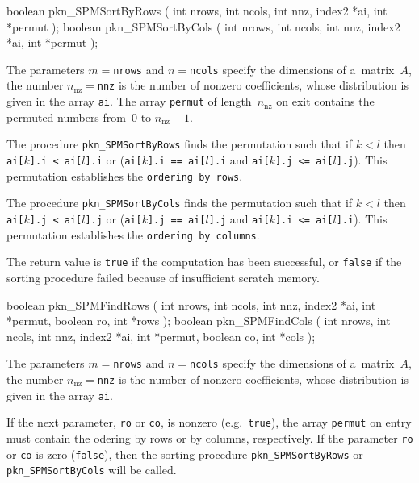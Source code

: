\begin{listingC}
boolean pkn_SPMSortByRows ( int nrows, int ncols, int nnz,
                            index2 *ai, int *permut );
boolean pkn_SPMSortByCols ( int nrows, int ncols, int nnz,
                            index2 *ai, int *permut );
\end{listingC}
The parameters $m=$\texttt{nrows} and $n=$\texttt{ncols} specify the
dimensions of a~matrix~$A$, the number $n_{\mathrm{nz}}=$\texttt{nnz} is
the number of nonzero coefficients, whose distribution is given in the array
\texttt{ai}. The array \texttt{permut} of length~$n_{\mathrm{nz}}$ on exit
contains the permuted numbers from~$0$ to $n_{\mathrm{nz}}-1$.

The procedure \texttt{pkn\_SPMSortByRows} finds the permutation such that
if $k<l$ then \texttt{ai[$k$].i < ai[$l$].i} or (\texttt{ai[$k$].i == ai[$l$].i}
and \texttt{ai[$k$].j <= ai[$l$].j}). This permutation establishes the
\texttt{ordering by rows}.

The procedure \texttt{pkn\_SPMSortByCols} finds the permutation such that
if $k<l$ then \texttt{ai[$k$].j < ai[$l$].j} or (\texttt{ai[$k$].j == ai[$l$].j}
and \texttt{ai[$k$].i <= ai[$l$].i}). This permutation establishes the
\texttt{ordering by columns}.

The return value is \texttt{true} if the computation has been successful, or
\texttt{false} if the sorting procedure failed because of insufficient
scratch memory.

\medskip
\begin{listingC}
boolean pkn_SPMFindRows ( int nrows, int ncols, int nnz,
                          index2 *ai, int *permut, boolean ro,
                          int *rows );
boolean pkn_SPMFindCols ( int nrows, int ncols, int nnz,
                          index2 *ai, int *permut, boolean co,
                          int *cols );
\end{listingC}
The parameters $m=$\texttt{nrows} and $n=$\texttt{ncols} specify the
dimensions of a~matrix~$A$, the number $n_{\mathrm{nz}}=$\texttt{nnz} is
the number of nonzero coefficients, whose distribution is given in the array
\texttt{ai}.

If the next parameter, \texttt{ro} or \texttt{co}, is nonzero
(e.g.\ \texttt{true}), the array \texttt{permut} on entry must contain the
odering by rows or by columns, respectively. If the parameter \texttt{ro} or
\texttt{co} is zero (\texttt{false}), then the sorting procedure
\texttt{pkn\_SPMSortByRows} or \texttt{pkn\_SPMSortByCols} will be
called.

